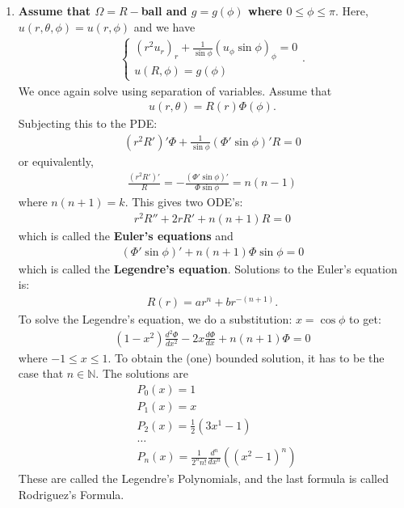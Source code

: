 \documentclass{book}
\theoremstyle{definition}
\newcommand{\f}[2]{\frac{#1}{#2}}
\newcommand{\lp}{\left(}
\newcommand{\rp}{\right)}
\begin{document}
\begin{enumerate}
	\item \textbf{Assume that $\Omega = R-$ball and $g = g(\phi)$ where $0\leq \phi \leq \pi$}. Here, $u(r,\theta,\phi) = u(r,\phi)$ and we have
	\begin{align*}
	\begin{cases}
	(r^2 u_r)_r + \f{1}{\sin\phi}( u_\phi \sin\phi)_\phi = 0\\
	u(R,\phi) = g(\phi)
	\end{cases}.
	\end{align*} 
	We once again solve using separation of variables. Assume that
	\begin{align*}
	u(r,\theta) = R(r)\Phi(\phi).
	\end{align*}  
	Subjecting this to the PDE:
	\begin{align*}
	(r^2 R')' \Phi + \f{1}{\sin\phi}(\Phi' \sin\phi )' R = 0
	\end{align*}
	or equivalently,
	\begin{align*}
	\f{(r^2 R')'}{R} = -\f{(\Phi' \sin\phi)'}{\Phi \sin\phi} = n(n-1)
	\end{align*}
	where $n(n+1) = k$. This gives two ODE's:
	\begin{align*}
	\boxed{r^2R'' + 2rR' + n(n+1)R = 0}
	\end{align*}
	which is called the \textbf{Euler's equations} and
	\begin{align*}
	\boxed{(\Phi' \sin\phi )' + n(n+1)\Phi\sin\phi = 0}
	\end{align*}
	which is called the \textbf{Legendre's equation}. Solutions to the Euler's equation is:
	\begin{align*}
	R(r) = ar^n + br^{-(n+1)}.
	\end{align*}
	To solve the Legendre's equation, we do a substitution: $x = \cos\phi$ to get:
	\begin{align*}
	\boxed{(1-x^2)\f{d^2\Phi}{dx^2} -2x\f{d\Phi}{dx} + n(n+1)\Phi = 0}
	\end{align*}
	where $-1\leq x \leq 1$. To obtain the (one) bounded solution, it has to be the case that $n\in \mathbb{N}$. The solutions are
	\begin{align*}
	&P_0(x) = 1\\
	&P_1(x) = x\\
	&P_2(x) = \f{1}{2}(3x^1 - 1)\\
	&\dots\\
	&\boxed{P_n(x) = \f{1}{2^n n!}\f{d^n}{dx^n}\lp (x^2 - 1)^n \rp}
	\end{align*} 
	These are called the Legendre's Polynomials, and the last formula is called Rodriguez's Formula. 
	

\end{enumerate}
\end{document}
